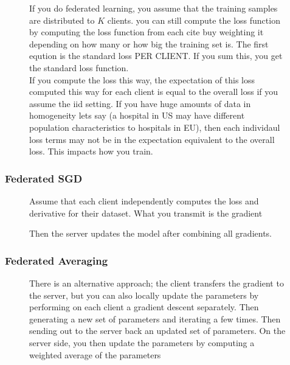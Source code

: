 \documentclass[11pt]{article}
\begin{document}
\begin{figure}[H]
    \centering
    \caption{If you do federated learning, you assume that the training samples are distributed to $K$ clients. you can still compute the loss function by computing the loss function from each cite buy weighting it depending on how many or how big the training set is. The first eqution is the standard loss PER CLIENT. If you sum this, you get the standard loss function.\\
    If you compute the loss this way, the expectation of this loss computed this way for each client is equal to the overall loss if you assume the iid setting. If you have huge amounts of data in homogeneity lets say (a hospital in US may have different population characteristics to hospitals in EU), then each individaul loss terms may not be in the expectation equivalent to the overall loss. This impacts how you train.}
\end{figure}

\subsubsection{Federated SGD}

\begin{figure}[H]
    \centering
    \caption{Assume that each client independently computes the loss and derivative for their dataset. What you transmit is the gradient}
\end{figure}

\begin{figure}[H]
    \centering
    \caption{Then the server updates the model after combining all gradients. }
\end{figure}

\subsubsection{Federated Averaging}

\begin{figure}[H]
    \centering
    \caption{There is an alternative approach; the client transfers the gradient to the server, but you can also locally update the parameters by performing on each client a gradient descent separately. Then generating a new set of parameters and iterating a few times. Then sending out to the server back an updated set of parameters. On the server side, you then update the parameters by computing a weighted average of the parameters}
\end{figure}
\end{document}

